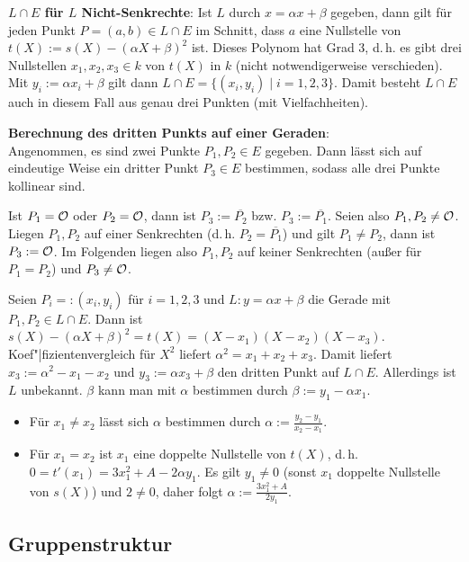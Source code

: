 \textbf{$L \cap E$ für $L$ Nicht-Senkrechte}:
Ist $L$ durch $x = \alpha x + \beta$ gegeben, dann gilt für jeden Punkt $P = (a, b) \in L \cap E$
im Schnitt, dass $a$ eine Nullstelle von $t(X) := s(X) - (\alpha X + \beta)^2$ ist.
Dieses Polynom hat Grad 3, d.\,h. es gibt drei Nullstellen $x_1, x_2, x_3 \in k$ von $t(X)$ in $k$
(nicht notwendigerweise verschieden).
Mit $y_i := \alpha x_i + \beta$ gilt dann $L \cap E = \{(x_i, y_i) \;|\; i = 1, 2, 3\}$.
Damit besteht $L \cap E$ auch in diesem Fall aus genau drei Punkten (mit Vielfachheiten).

\linie

\textbf{Berechnung des dritten Punkts auf einer Geraden}:\\
Angenommen, es sind zwei Punkte $P_1, P_2 \in E$ gegeben.
Dann lässt sich auf eindeutige Weise ein dritter Punkt $P_3 \in E$ bestimmen,
sodass alle drei Punkte kollinear sind.

Ist $P_1 = \mathcal{O}$ oder $P_2 = \mathcal{O}$, dann ist $P_3 := \overline{P_2}$ bzw. $P_3 := \overline{P_1}$.
Seien also $P_1, P_2 \not= \mathcal{O}$.
Liegen $P_1, P_2$ auf einer Senkrechten (d.\,h. $P_2 = \overline{P_1}$)
und gilt $P_1 \not= P_2$, dann ist $P_3 := \mathcal{O}$.
Im Folgenden liegen also $P_1, P_2$ auf keiner Senkrechten
(außer für $P_1 = P_2$) und $P_3 \not= \mathcal{O}$.

Seien $P_i =: (x_i, y_i)$ für $i = 1, 2, 3$ und $L\colon y = \alpha x + \beta$ die Gerade
mit $P_1, P_2 \in L \cap E$.
Dann ist $s(X) - (\alpha X + \beta)^2 = t(X) = (X - x_1) (X - x_2) (X - x_3)$.
Koef"|fizientenvergleich für $X^2$ liefert $\alpha^2 = x_1 + x_2 + x_3$.
Damit liefert $x_3 := \alpha^2 - x_1 - x_2$ und $y_3 := \alpha x_3 + \beta$ den dritten Punkt auf
$L \cap E$.
Allerdings ist $L$ unbekannt.
$\beta$ kann man mit $\alpha$ bestimmen durch $\beta := y_1 - \alpha x_1$.
\begin{itemize}
    \item
    Für $x_1 \not= x_2$ lässt sich $\alpha$ bestimmen durch
    $\alpha := \frac{y_2 - y_1}{x_2 - x_1}$.
    
    \item
    Für $x_1 = x_2$ ist $x_1$ eine doppelte Nullstelle von $t(X)$,
    d.\,h. $0 = t'(x_1) = 3x_1^2 + A - 2\alpha y_1$.
    Es gilt $y_1 \not= 0$ (sonst $x_1$ doppelte Nullstelle von $s(X)$) und $2 \not= 0$,
    daher folgt $\alpha := \frac{3x_1^2 + A}{2y_1}$.
\end{itemize}

\pagebreak

\subsection{%
    Gruppenstruktur%
}

